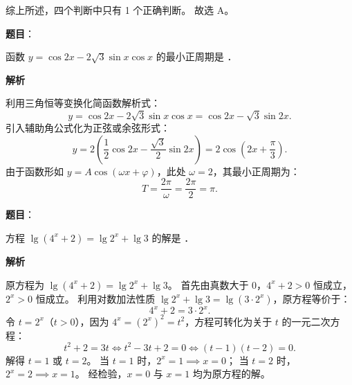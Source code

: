 \begin{answer}
综上所述，四个判断中只有 1 个正确判断。
故选 A。


\end{answer}
\begin{answer}

\textbf{题目}：

函数 $y=\cos 2x-2\sqrt{3}\sin x\cos x$ 的最小正周期是 \underline{\hspace{3em}}．

\textbf{解析}

利用三角恒等变换化简函数解析式：
\nopagebreak[4]
\[
y=\cos 2x-2\sqrt{3}\sin x\cos x=\cos 2x-\sqrt{3}\sin 2x.
\]
引入辅助角公式化为正弦或余弦形式：
\nopagebreak[4]
\[
y=2\left(\frac{1}{2}\cos 2x-\frac{\sqrt{3}}{2}\sin 2x\right)=2\cos\left(2x+\frac{\pi}{3}\right).
\]
由于函数形如 $y=A\cos(\omega x+\varphi)$，此处 $\omega=2$，其最小正周期为：
\nopagebreak[4]
\[
T=\frac{2\pi}{\omega}=\frac{2\pi}{2}=\pi.
\]


\end{answer}
\begin{answer}

\textbf{题目}：

方程 $\lg(4^x+2)=\lg 2^x+\lg 3$ 的解是 \underline{\hspace{3em}}．

\textbf{解析}

原方程为 $\lg(4^x+2)=\lg 2^x+\lg 3$。
首先由真数大于 0，$4^x+2>0$ 恒成立，$2^x>0$ 恒成立。
利用对数加法性质 $\lg 2^x+\lg 3=\lg(3\cdot 2^x)$，原方程等价于：
\nopagebreak[4]
\[
4^x+2=3\cdot 2^x.
\]
令 $t=2^x$（$t>0$），因为 $4^x=(2^x)^2=t^2$，方程可转化为关于 $t$ 的一元二次方程：
\nopagebreak[4]
\[
t^2+2=3t\iff t^2-3t+2=0\iff (t-1)(t-2)=0.
\]
解得 $t=1$ 或 $t=2$。
当 $t=1$ 时，$2^x=1\implies x=0$；
当 $t=2$ 时，$2^x=2\implies x=1$。
经检验，$x=0$ 与 $x=1$ 均为原方程的解。


\end{answer}
